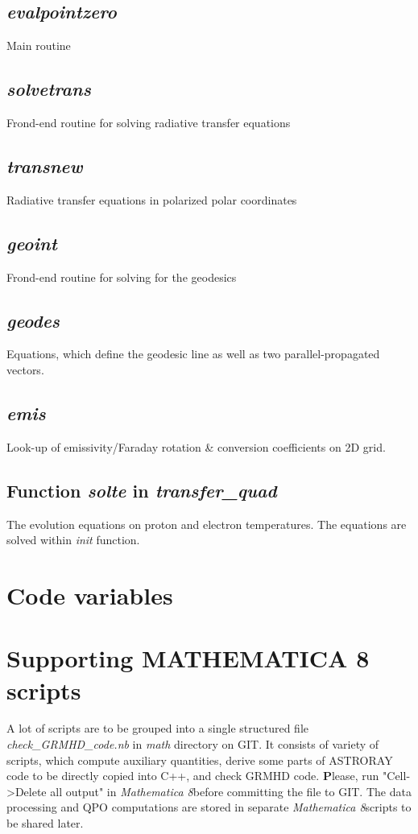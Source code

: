 \documentclass{emulateapj}
\newcommand{\mat}{\textit{Mathematica 8}}
\begin{document}
\subsection{\textit{evalpointzero}}
Main routine
\subsection{\textit{solvetrans}}
Frond-end routine for solving radiative transfer equations
\subsection{\textit{transnew}}
Radiative transfer equations in polarized polar coordinates
\subsection{\textit{geoint}}
Frond-end routine for solving for the geodesics
\subsection{\textit{geodes}}
Equations, which define the geodesic line as well as two parallel-propagated vectors.
\subsection{\textit{emis}}
Look-up of emissivity/Faraday rotation \& conversion coefficients on 2D grid.
\subsection{Function \textit{solte} in \textit{transfer\_quad}}
The evolution equations on proton and electron temperatures. The equations are solved within \textit{init} function.

\section{Code variables}


\section{Supporting MATHEMATICA 8 scripts}
A lot of scripts are to be grouped into a single structured file \textit{check\_GRMHD\_code.nb} in \textit{math} directory on GIT.
It consists of variety of scripts, which compute auxiliary quantities, derive some parts of ASTRORAY code to be directly copied into C++, and check GRMHD code.
{\textbf Please, run "Cell->Delete all output" in \mat before committing the file to GIT.}
The data processing and QPO computations are stored in separate \mat scripts to be shared later.
\end{document}
